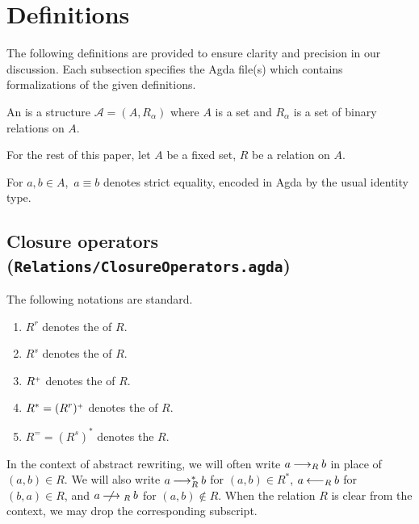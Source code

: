 \section{Definitions}
\label{sec:Definitions}
The following definitions are provided to ensure clarity and precision
in our discussion. Each subsection specifies the Agda file(s) which contains formalizations of the given definitions.

\begin{definition}
    An  is a structure $\mathcal{A} = (A, R_\alpha)$ where
     $A$ is a set and $R_\alpha$ is a set of binary relations on $A$.
\end{definition}

For the rest of this paper, let $A$ be a fixed set, $R$ be a relation on $A$.

For $a,b \in A$,\ $a \equiv b$ denotes strict equality, encoded in Agda by the usual identity type.



\subsection{Closure operators (\texttt{Relations/ClosureOperators.agda})}

\begin{notation}
The following notations are standard.
  \begin{enumerate}
    \item $R^r$ denotes the  of $R$.
    \item $R^s$ denotes the  of $R$.
    \item ${R}^{\scriptscriptstyle{+}}$ denotes the  of $R$.
    \item $R^* = (R^r){}^{\scriptscriptstyle{+}}$ denotes the  of $R$.
    \item $R^= = (R^s)^*$ denotes the  $R$.
  \end{enumerate}
\end{notation}

In the context of abstract rewriting, we will often write $a \mathbin{\longrightarrow_R} b$
in place of $(a,b) \in R$.  We will also write $a \mathbin{\longrightarrow_R^*} b$ for $(a,b) \in R^*$,
$a \mathbin{\longleftarrow_R} b$ for $(b,a) \in R$, and $a \nrstep b$ for $(a,b)\notin R$.  When the relation $R$ is clear from the context,
we may drop the corresponding subscript.

